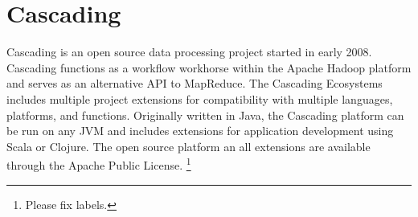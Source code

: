 \section{Cascading}

Cascading is an open source data processing project started in early
2008. Cascading functions as a workflow workhorse within the Apache Hadoop
platform and serves as an alternative API to MapReduce. The Cascading Ecosystems
includes multiple project extensions for compatibility with multiple languages,
platforms, and functions\cite{CascadingEco}. Originally written in Java, the
Cascading platform can be run on any JVM and includes extensions for application
development using Scala or Clojure. The open source platform an all extensions
are available through the Apache Public
License\cite{GitHubCascading}. \footnote{Please fix labels.}
